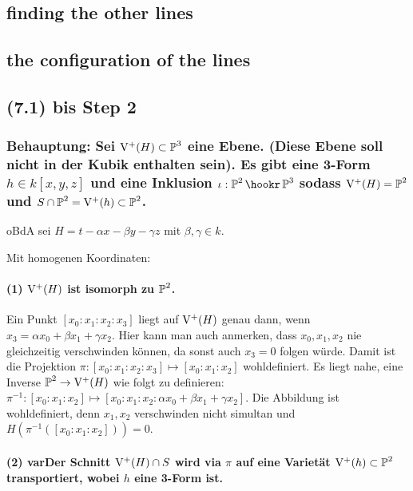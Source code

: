 \subsection{finding the other lines}
\subsection{the configuration of the lines}


\subsection{(7.1) bis Step 2}


\subsubsection{%
Behauptung: Sei $\operatorname{V^+}(H) \subset \operatorname{\mathbb P}^3$ eine Ebene.
(Diese Ebene soll nicht in der Kubik enthalten sein).
Es gibt eine 3-Form $h \in k[x,y,z]$ und eine Inklusion $\iota : \proj^2 \hookr \proj^3$ sodass $\operatorname{V^+}(H) = \operatorname{\mathbb P}^2$ und $S\cap \operatorname{\mathbb P}^2 = \operatorname{V^+}(h) \subset \operatorname{\mathbb P}^2$.
} %

oBdA sei $H = t - \alpha x -  \beta y - \gamma z$ mit $\beta, \gamma \in k$.

Mit homogenen Koordinaten:
\paragraph{(1) $\operatorname{V^+}(H)$ ist isomorph zu $\operatorname{\mathbb P}^2$.}
Ein Punkt $[x_0:x_1:x_2:x_3]$ liegt auf $\operatorname{V^+}(H)$ genau dann, wenn $x_3 = \alpha x_0 + \beta x_1 + \gamma x_2$.
Hier kann man auch anmerken, dass $x_0,x_1,x_2$ nie gleichzeitig verschwinden können, da sonst auch $x_3 = 0$ folgen würde.
Damit ist die Projektion $\pi : [x_0:x_1:x_2:x_3] \mapsto [x_0:x_1:x_2]$ wohldefiniert.
Es liegt nahe, eine Inverse $\operatorname{\mathbb P}^2 \to \operatorname{V^+}(H)$ wie folgt zu definieren:
$\pi^{-1} : [x_0:x_1:x_2] \mapsto [x_0 : x_1 : x_2 : \alpha x_0 + \beta x_1 + \gamma x_2]$.
Die Abbildung ist wohldefiniert, denn $x_1,x_2$ verschwinden nicht simultan und $H(\pi^{-1}([x_0:x_1:x_2])) = 0$.

\paragraph{(2) var{Der} Schnitt $\operatorname{V^+}(H) \cap S$ wird via $\pi$ auf eine Varietät $\operatorname{V^+}(h) \subset \operatorname{\mathbb P}^2$ transportiert, wobei $h$ eine 3-Form ist.}

